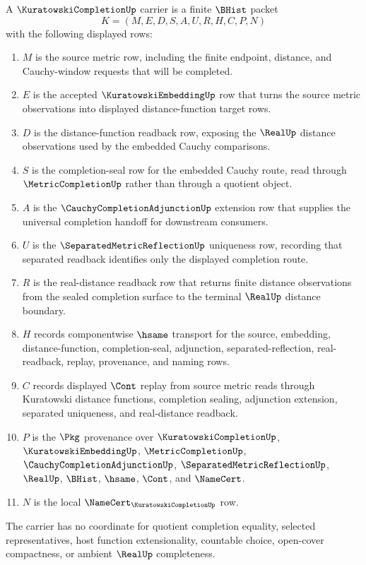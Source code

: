\begin{definition}
\label{def:kuratowski-completion-carrier}
A $\KuratowskiCompletionUp$ carrier is a finite $\BHist$ packet
$$
K=(M,E,D,S,A,U,R,H,C,P,N)
$$
with the following displayed rows:
\begin{enumerate}
\item $M$ is the source metric row, including the finite endpoint, distance, and Cauchy-window requests that will be completed.
\item $E$ is the accepted $\KuratowskiEmbeddingUp$ row that turns the source metric observations into displayed distance-function target rows.
\item $D$ is the distance-function readback row, exposing the $\RealUp$ distance observations used by the embedded Cauchy comparisons.
\item $S$ is the completion-seal row for the embedded Cauchy route, read through $\MetricCompletionUp$ rather than through a quotient object.
\item $A$ is the $\CauchyCompletionAdjunctionUp$ extension row that supplies the universal completion handoff for downstream consumers.
\item $U$ is the $\SeparatedMetricReflectionUp$ uniqueness row, recording that separated readback identifies only the displayed completion route.
\item $R$ is the real-distance readback row that returns finite distance observations from the sealed completion surface to the terminal $\RealUp$ distance boundary.
\item $H$ records componentwise $\hsame$ transport for the source, embedding, distance-function, completion-seal, adjunction, separated-reflection, real-readback, replay, provenance, and naming rows.
\item $C$ records displayed $\Cont$ replay from source metric reads through Kuratowski distance functions, completion sealing, adjunction extension, separated uniqueness, and real-distance readback.
\item $P$ is the $\Pkg$ provenance over $\KuratowskiCompletionUp$, $\KuratowskiEmbeddingUp$, $\MetricCompletionUp$, $\CauchyCompletionAdjunctionUp$, $\SeparatedMetricReflectionUp$, $\RealUp$, $\BHist$, $\hsame$, $\Cont$, and $\NameCert$.
\item $N$ is the local $\NameCert_{\KuratowskiCompletionUp}$ row.
\end{enumerate}
The carrier has no coordinate for quotient completion equality, selected representatives, host function extensionality, countable choice, open-cover compactness, or ambient $\RealUp$ completeness.
\end{definition}

